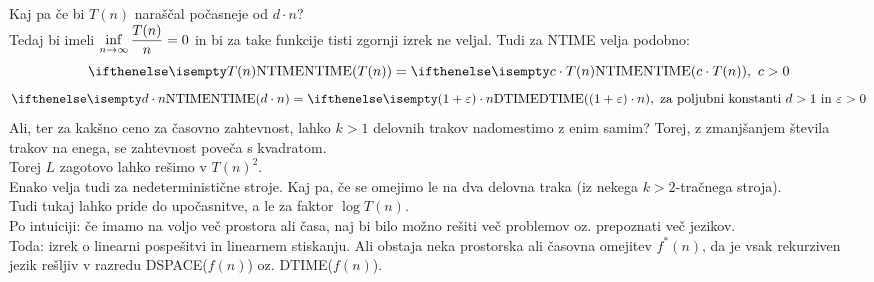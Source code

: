 \documentclass[10pt,a4paper,oneside]{book}
\begin{document}
Kaj pa če bi $T(n)$ naraščal počasneje od $d \cdot n$?\\
Tedaj bi imeli $\displaystyle\inf_{n\to\infty} {T(n) \over n} = 0$ %
 in bi za take funkcije tisti zgornji izrek ne veljal.%
\br
Tudi za NTIME velja podobno:
	\[ \NTIME{T(n)} = \NTIME{c\cdot T(n)},\ c>0 \]%
	\[ \NTIME{d \cdot n} = \DTIME{(1+\varepsilon)\cdot n},\mbox{ za poljubni konstanti $d>1$ in $\varepsilon>0$} \]
Ali, ter za kakšno ceno za časovno zahtevnost, lahko $k>1$ delovnih trakov nadomestimo z enim samim?
Torej, z zmanjšanjem števila trakov na enega, se zahtevnost poveča s kvadratom.\\
Torej $L$ zagotovo lahko rešimo v $T(n)^2$.\\
Enako velja tudi za nedeterministične stroje.
\br
Kaj pa, če se omejimo le na dva delovna traka (iz nekega $k>2$-tračnega stroja).\\
Tudi tukaj lahko pride do upočasnitve, a le za faktor $\log T(n)$.\\
Po intuiciji: če imamo na voljo več prostora ali časa, naj bi bilo možno rešiti več problemov oz. prepoznati več jezikov.\\
Toda: izrek o linearni pospešitvi in linearnem stiskanju.
Ali obstaja neka  prostorska ali časovna omejitev $f^*(n)$, da je vsak rekurziven jezik rešljiv v razredu DSPACE($f(n)$) oz. DTIME($f(n)$).\\
\end{document}
